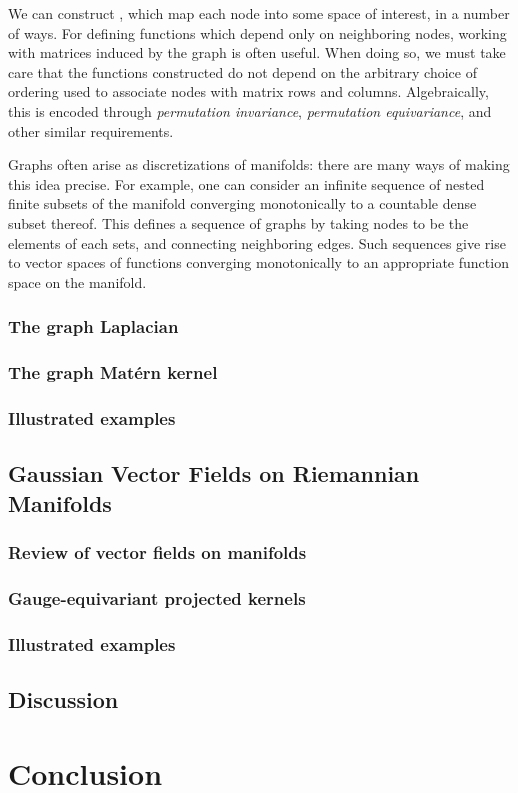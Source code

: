 \documentclass[11pt]{book}
\begin{document}
We can construct , which map each node into some space of interest, in a number of ways.
For defining functions which depend only on neighboring nodes, working with matrices induced by the graph is often useful.
When doing so, we must take care that the functions constructed do not depend on the arbitrary choice of ordering used to associate nodes with matrix rows and columns. Algebraically, this is encoded through \emph{permutation invariance}, \emph{permutation equivariance}, and other similar requirements.


Graphs often arise as discretizations of manifolds: there are many ways of making this idea precise.
For example, one can consider an infinite sequence of nested finite subsets of the manifold converging monotonically to a countable dense subset thereof.
This defines a sequence of graphs by taking nodes to be the elements of each sets, and connecting neighboring edges.
Such sequences give rise to vector spaces of functions converging monotonically to an appropriate function space on the manifold.

\subsection{The graph Laplacian}


\subsection{The graph Matérn kernel}
\subsection{Illustrated examples}

\section{Gaussian Vector Fields on Riemannian Manifolds}

\subsection{Review of vector fields on manifolds}
\subsection{Gauge-equivariant projected kernels}
\subsection{Illustrated examples}

\section{Discussion}
\label{sec:noneuclidean-discussion}





\chapter{Conclusion}
\label{ch:conclusion}

\printbibliography
\end{document}
